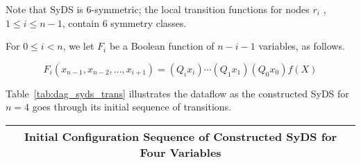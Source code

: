 Note that SyDS \cals{} is 6-symmetric; 
the local transition functions for nodes $r_i$ , $1 \leq i \leq n-1$, contain 6 symmetry classes.

For $0 \leq i < n$, we let $F_i$ be a Boolean function of $n-i-1$ variables, as follows.

$$F_i(x_{n-1}, x_{n-2}, \ldots , x_{i+1}) = (Q_ i x_i) \cdots (Q_1 x_1) (Q_0 x_0) f(X)$$

Table~\ref{tab:dag_syds_trans}
illustrates the dataflow as the constructed SyDS \cals{}  for $n =4$ goes through
its initial sequence of transitions.




\begin{table*}
\begin{center}
\begin{tabular}{|l | c c c c c c c c c c c |} \hline
\multicolumn{12}{c|}{{\bf Initial Configuration Sequence of  Constructed SyDS for Four Variables}}
        \\ \hline


\end{tabular}
\end{center}
\end{table*}
